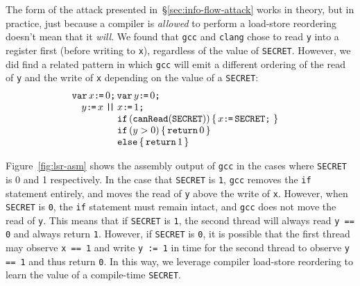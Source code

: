 The form of the attack presented in~\S\ref{sec:info-flow-attack} works in
theory, but in practice, just because a compiler is \emph{allowed} to perform a
load-store reordering doesn't mean that it \emph{will}.
We found that \verb|gcc| and \verb|clang| chose to read \verb|y| into a
register first (before writing to \verb|x|), regardless of the value of
\verb|SECRET|.
However, we did find a related pattern in which \verb|gcc| will emit a
different ordering of the read of \verb|y| and the write of \verb|x| depending
on the value of a \verb|SECRET|:
\[\begin{array}[t]{@{}l}
  \VAR x\GETS0\SEMI \VAR y\GETS0\SEMI\\\quad
    y\GETS x
  \PAR\begin{array}[t]{@{}l}
    x\GETS 1\SEMI\\
    \IF(\CANREAD(\SEC))\THEN x\GETS\SEC\SEMI\FI\\
    \IF(y > 0)\THEN \RETURN 0
    \brELSE \RETURN 1\FI
\end{array}\end{array}\]


Figure~\ref{fig:lsr-asm} shows the assembly output of \verb|gcc| in the cases
where \verb|SECRET| is 0 and 1 respectively.
In the case that \verb|SECRET| is \verb|1|, \verb|gcc| removes the \verb|if|
statement entirely, and moves the read of \verb|y| above the write of \verb|x|.
However, when \verb|SECRET| is \verb|0|, the \verb|if| statement must remain
intact, and \verb|gcc| does not move the read of \verb|y|.
This means that if \verb|SECRET| is \verb|1|, the second thread will always
read \verb|y == 0| and always return \verb|1|.
However, if \verb|SECRET| is \verb|0|, it is possible that the first thread
may observe \verb|x == 1| and write \verb|y := 1| in time for the second thread
to observe \verb|y == 1| and thus return \verb|0|.
In this way, we leverage compiler load-store reordering to learn the value of
a compile-time \verb|SECRET|.

